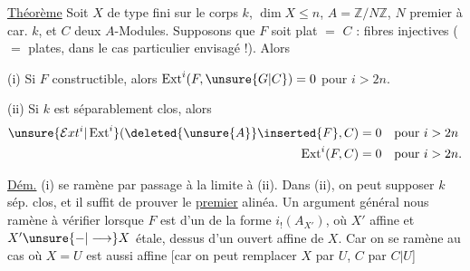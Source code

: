 \uline{Théorème} Soit $X$ de type  fini sur le corps $k$, $\dim X\leq n$, $A=\mathbb{Z}/N\mathbb{Z}$, $N$ premier à car. $k$,   et $C$ deux $A$-Modules. Supposons que $F$ soit plat $=$ $C$ : fibres injectives ($=$ plates, dans le cas particulier envisagé !). Alors

(i) Si $F$ constructible, alors $\operatorname{Ext}^i(F,\unsure{G|C})=0$ pour $i>2n$.

(ii) Si $k$ est séparablement clos, alors 
\[
\begin{aligned}
\unsure{\mathcal{E}xt^i|\operatorname{Ext}^i}(\deleted{\unsure{A}}\inserted{F},C)&=0&\text{pour }i&>2n\\
\operatorname{Ext}^i(F,C)&=0&\text{pour }i&>2n.
\end{aligned}
\]

\uline{Dém.} (i) se ramène par passage à la limite à (ii). Dans (ii), on peut supposer $k$ sép. clos, et  il suffit de prouver le \uline{premier} alinéa.  Un argument général nous ramène à  vérifier  lorsque $F$ est  d'un  de la forme $i_!(A_{X'})$, où $X'$ affine et $X'\unsure{-|\longrightarrow}X$ étale,  dessus d'un ouvert affine  de $X$. Car on se ramène au cas où $X=U$ est aussi affine [car on peut remplacer $X$ par $U$, $C$ par $C|U$]
